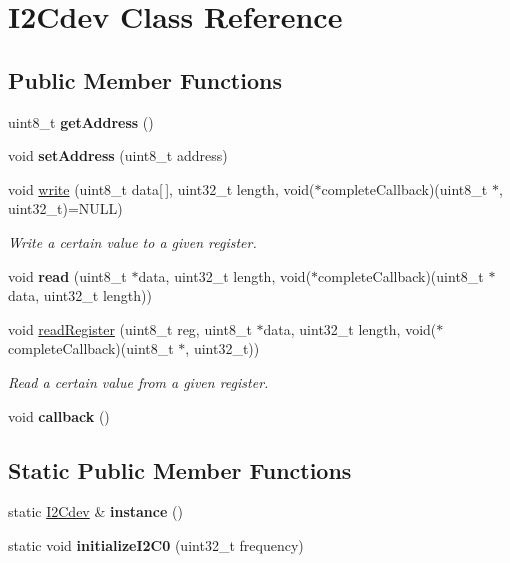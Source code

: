 \hypertarget{class_i2_cdev}{}\section{I2\+Cdev Class Reference}
\label{class_i2_cdev}
\subsection*{Public Member Functions}
\begin{DoxyCompactItemize}
\item 
\mbox{\label{class_i2_cdev_a19a57cf53835ca59ef391653906fd3b0}} 
uint8\+\_\+t {\bfseries get\+Address} ()
\item 
\mbox{\label{class_i2_cdev_a43621fa70ca5d13df2c7837c31d9c36c}} 
void {\bfseries set\+Address} (uint8\+\_\+t address)
\item 
void \hyperlink{class_i2_cdev_aa8ff2bc52507231fbbdb5cb5ef6e020d}{write} (uint8\+\_\+t data\mbox{[}$\,$\mbox{]}, uint32\+\_\+t length, void($\ast$complete\+Callback)(uint8\+\_\+t $\ast$, uint32\+\_\+t)=N\+U\+LL)
\begin{DoxyCompactList}\small\item\em Write a certain value to a given register. \end{DoxyCompactList}\item 
\mbox{\label{class_i2_cdev_a7b302621c92feb6ac501ccafeedaa178}} 
void {\bfseries read} (uint8\+\_\+t $\ast$data, uint32\+\_\+t length, void($\ast$complete\+Callback)(uint8\+\_\+t $\ast$data, uint32\+\_\+t length))
\item 
void \hyperlink{class_i2_cdev_a33672bbff055aeb19b5e75ad0a2def4a}{read\+Register} (uint8\+\_\+t reg, uint8\+\_\+t $\ast$data, uint32\+\_\+t length, void($\ast$complete\+Callback)(uint8\+\_\+t $\ast$, uint32\+\_\+t))
\begin{DoxyCompactList}\small\item\em Read a certain value from a given register. \end{DoxyCompactList}\item 
\mbox{\label{class_i2_cdev_adfad35e4a5689859a96dc33e772ffe46}} 
void {\bfseries callback} ()
\end{DoxyCompactItemize}
\subsection*{Static Public Member Functions}
\begin{DoxyCompactItemize}
\item 
\mbox{\label{class_i2_cdev_a6c23c85743bcfa7ce51256adaa17fd22}} 
static \hyperlink{class_i2_cdev}{I2\+Cdev} \& {\bfseries instance} ()
\item 
\mbox{\label{class_i2_cdev_ade55a4cd4906e8bff5d931226ed967d5}} 
static void {\bfseries initialize\+I2\+C0} (uint32\+\_\+t frequency)
\end{DoxyCompactItemize}


